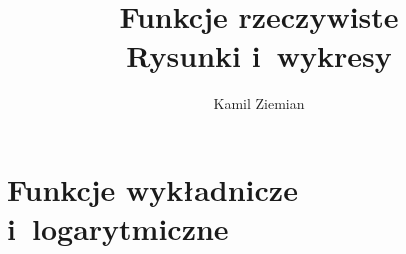\documentclass[a4paper,11pt]{article}
\title{Funkcje rzeczywiste \\
  {\Large Rysunki i~wykresy}}
\author{Kamil Ziemian}
\numberwithin{equation}{section}
\begin{document}





\maketitle





\section{Funkcje wykładnicze i~logarytmiczne}

\label{sec:Funkcje-wykladnicze-i-logarytmiczne}






\end{document}
